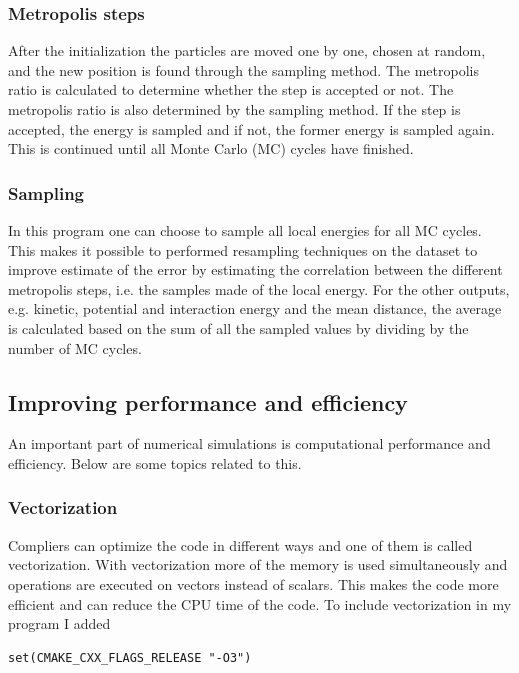 \subsubsection{Metropolis steps}

After the initialization the particles are moved one by one, chosen at random, and the new position is found through the sampling method. The metropolis ratio is calculated to determine whether the step is accepted or not. The metropolis ratio is also determined by the sampling method. If the step is accepted, the energy is sampled and if not, the former energy is sampled again. This is continued until all Monte Carlo (MC) cycles have finished. 

\subsubsection{Sampling}

In this program one can choose to sample all local energies for all MC cycles. This makes it possible to performed resampling techniques on the dataset to improve estimate of the error by estimating the correlation between the different metropolis steps, i.e. the samples made of the local energy. For the other outputs, e.g. kinetic, potential and interaction energy and the mean distance, the average is calculated based on the sum of all the sampled values by dividing by the number of MC cycles.

\subsection{Improving performance and efficiency}

An important part of numerical simulations is computational performance and efficiency. Below are some topics related to this.

\subsubsection{Vectorization}

Compliers can optimize the code in different ways and one of them is called vectorization. With vectorization more of the memory is used simultaneously and operations are executed on vectors instead of scalars. This makes the code more efficient and can reduce the CPU time of the code. To include vectorization in my program I added

\begin{lstlisting}
set(CMAKE_CXX_FLAGS_RELEASE "-O3")
\end{lstlisting}

